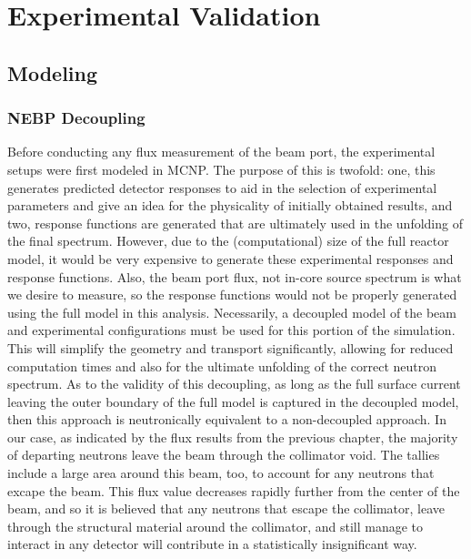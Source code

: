 
\cleardoublepage


\chapter{Experimental Validation}




\section{Modeling}

\subsection{NEBP Decoupling}

Before conducting any flux measurement of the beam port, the experimental setups were first modeled in MCNP.
The purpose of this is twofold: one, this generates predicted detector responses to aid in the selection of experimental parameters and give an idea for the physicality of initially obtained results, and two, response functions are generated that are ultimately used in the unfolding of the final spectrum.
However, due to the (computational) size of the full reactor model, it would be very expensive to generate these experimental responses and response functions.
Also, the beam port flux, not in-core source spectrum is what we desire to measure, so the response functions would not be properly generated using the full model in this analysis.
Necessarily, a decoupled model of the beam and experimental configurations must be used for this portion of the simulation.
This will simplify the geometry and transport significantly, allowing for reduced computation times and also for the ultimate unfolding of the correct neutron spectrum.
As to the validity of this decoupling, as long as the full surface current leaving the outer boundary of the full model is captured in the decoupled model, then this approach is neutronically equivalent to a non-decoupled approach.
In our case, as indicated by the flux results from the previous chapter, the majority of departing neutrons leave the beam through the collimator void.
The tallies include a large area around this beam, too, to account for any neutrons that excape the beam.
This flux value decreases rapidly further from the center of the beam, and so it is believed that any neutrons that escape the collimator, leave through the structural material around the collimator, and still manage to interact in any detector will contribute in a statistically insignificant way.

